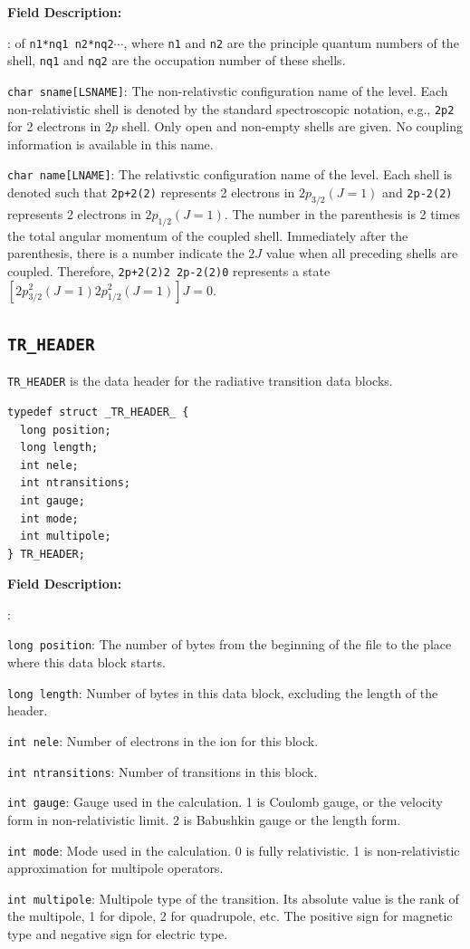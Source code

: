 \documentclass[twoside,letterpaper]{refrep}
\newenvironment{dbdesc}{\textbf{Field Description:} \begin{list}
	{:}{\setlength{\labelwidth}{2in}
	   \setlength{\leftmargin}{2in}
	   \setlength{\labelsep}{0.1in}
	   \setlength{\rightmargin}{0.2in}}}
	{\end{list}}
\begin{document}
\begin{dbdesc}
of \verb|n1*nq1 n2*nq2|$\cdots$, where \verb|n1| and \verb|n2| are the
principle quantum numbers of the shell, \verb|nq1| and \verb|nq2| are the
occupation number of these shells.
\item[\texttt{char sname[LSNAME]}:] The non-relativstic configuration name of
the level. Each non-relativistic shell is denoted by the standard
spectroscopic notation, e.g., \verb|2p2| for 2 electrons in $2p$ shell. Only
open and non-empty shells are given. No coupling information is available in
this name.
\item[\texttt{char name[LNAME]}:] The relativstic configuration name of the
level. Each shell is denoted such that \verb|2p+2(2)| represents 2 electrons in
$2p_{3/2}(J=1)$ and \verb|2p-2(2)| represents 2 electrons in
$2p_{1/2}(J=1)$. The number in the parenthesis is 2 times the total angular
momentum of the coupled shell. Immediately after the parenthesis, there is a
number indicate the $2J$ value when all preceding shells are
coupled. Therefore, \verb|2p+2(2)2 2p-2(2)0| represents a state
$[2p_{3/2}^{2}(J=1) 2p_{1/2}^2(J=1)]J=0$.
\end{dbdesc}

\subsection{\texttt{TR\_HEADER}}
\texttt{TR\_HEADER} is the data header for the radiative transition data
blocks. 

\begin{verbatim}
typedef struct _TR_HEADER_ {
  long position;
  long length;
  int nele;
  int ntransitions;
  int gauge;
  int mode;
  int multipole;
} TR_HEADER;
\end{verbatim}

\begin{dbdesc}
\item[\texttt{long position}:] The number of bytes from the beginning of the
file to the place where this data block starts.
\item[\texttt{long length}:] Number of bytes in this data block, excluding the
length of the header.
\item[\texttt{int nele}:] Number of electrons in the ion for this block.
\item[\texttt{int ntransitions}:] Number of transitions in this block.
\item[\texttt{int gauge}:] Gauge used in the calculation. 1 is Coulomb gauge, or
the velocity form in non-relativistic limit. 2 is Babushkin gauge or the
length form.
\item[\texttt{int mode}:] Mode used in the calculation. 0 is fully
relativistic. 1 is non-relativistic approximation for multipole operators.
\item[\texttt{int multipole}:] Multipole type of the transition. Its absolute
value is the rank of the multipole, 1 for dipole, 2 for quadrupole, etc. The
positive sign for magnetic type and negative sign for electric type.
\end{dbdesc}
\end{document}
